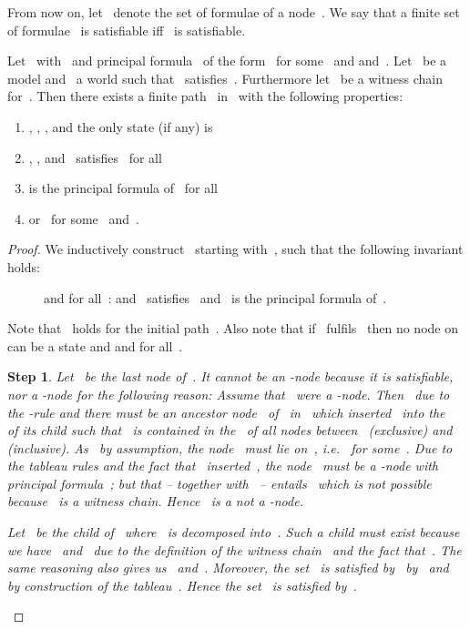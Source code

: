 \documentclass{entcs}
\newtheorem{stp}{Step}
\newenvironment{step}{\vspace{-\lastskip}\par \addvspace{.6pc
    plus .2pc minus .1pc}\begin{stp}\rm}{\end{stp}\par\addvspace{.6pc
    plus .2pc minus .1pc}}
\newcommand{\ie}{\emph{i.e.}}
\newcommand{\trid}{}
\newcommand{\trero}{}
\newcommand{\trert}{}
\begin{document}
\begin{center}
From now on,
let~ denote the set of formulae of a node~.
We say that a finite set of formulae~ is satisfiable
iff~ is satisfiable.
\begin{lemma}
  \label{lemma_focus}
  Let~ with~ and principal formula~
  of the form~
  for some~ and  and~.
  Let~ be a model and~ a world such that~ satisfies~.
  Furthermore let~ be a witness chain for~.
  Then there exists a finite path~ in~
  with the following properties:
  \renewcommand{\theenumi}{(\roman{enumi})}
  \renewcommand{\labelenumi}{\theenumi}
  \begin{enumerate}
  \item , , , and the only state (if any) is~
  \item , , and~ satisfies~ for all~
  \item  is the principal formula of~ for all~
  \item  or~ for some~ and~.
  \end{enumerate}
\end{lemma}
\begin{proof}
  We inductively construct~ starting with~,
  such that the following invariant holds:
  \begin{description}
  \item[]  and for all~:
     and~ satisfies~ and~ is the principal formula of~.
  \end{description}
  Note that~ holds for the initial path~.
  Also note that if~ fulfils~
  then no node on~ can be a state and
  and  for all~.
  \begin{step}
    \label{step_two}
    Let~ be the last node of~.
    It cannot be an \trid{}-node because it is satisfiable,
    nor a \trert{}-node for the following reason:
    Assume that~ were a \trert{}-node.
    Then~ due to the \trert{}-rule
    and there must be an ancestor node~ of~ in~
    which inserted~ into the~ of its child
    such that~ is contained in the~ of all nodes
    between~ (exclusive) and~ (inclusive).
    As~ by assumption,
    the node~ must lie on~,
    \ie{}~ for some~.
    Due to the tableau rules and the fact that~ inserted~, 
    the node~ must be a \trero{}-node with principal formula~;
    but that -- together with~ --
    entails~
    which is not possible because~ is a witness chain.
    Hence~ is a not a \trert{}-node.

    Let~ be the child of~
    where~ is decomposed into~.
    Such a child must exist because we have~ and~
    due to the definition of the witness chain~ and the fact that~.
    The same reasoning also gives us~ and~.
    Moreover, the set~ is satisfied by~ by~
    and~ by construction of the tableau~.
    Hence the set~ is satisfied by~.


\end{step}
\end{proof}
\end{center}
\end{document}
